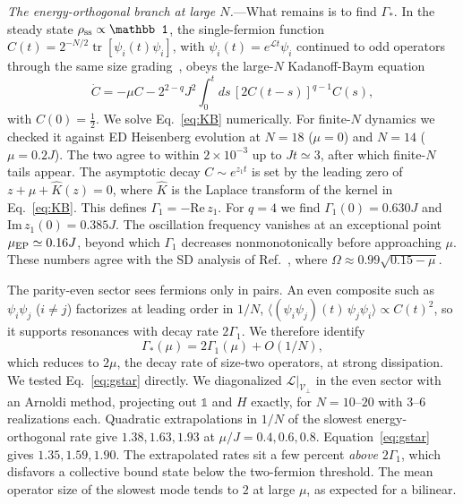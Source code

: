 \documentclass[aps,prl,twocolumn,superscriptaddress,amsmath,amssymb,10pt]{revtex4-2}
\newcommand{\Lc}{\mathcal{L}}
\newcommand{\tr}{\operatorname{tr}}
\begin{document}
\emph{The energy-orthogonal branch at large $N$.}---What remains is to find $\Gamma_\ast$. In the steady state $\rho_{\rm ss}\propto\mathbb 1$, the single-fermion function $C(t)=2^{-N/2}\tr[\psi_i(t)\psi_i]$, with $\psi_i(t)=e^{\Lc t}\psi_i$ continued to odd operators through the same size grading~\cite{Kulkarni2022,Garcia2023}, obeys the large-$N$ Kadanoff-Baym equation
\begin{equation}
\dot C=-\mu C-2^{2-q}J^2\!\int_0^t\!ds\,[2C(t-s)]^{q-1}C(s),
\label{eq:KB}
\end{equation}
with $C(0)=\tfrac12$. We solve Eq.~\eqref{eq:KB} numerically. For finite-$N$ dynamics we checked it against ED Heisenberg evolution at $N=18$ ($\mu=0$) and $N=14$ ($\mu=0.2J$). The two agree to within $2\times10^{-3}$ up to $Jt\simeq3$, after which finite-$N$ tails appear. The asymptotic decay $C\sim e^{z_1t}$ is set by the leading zero of $z+\mu+\hat K(z)=0$, where $\hat K$ is the Laplace transform of the kernel in Eq.~\eqref{eq:KB}. This defines $\Gamma_1=-\mathrm{Re}\,z_1$. For $q=4$ we find $\Gamma_1(0)=0.630J$ and $\mathrm{Im}\,z_1(0)=0.385J$. The oscillation frequency vanishes at an exceptional point $\mu_{\rm EP}\simeq0.16J$, beyond which $\Gamma_1$ decreases nonmonotonically before approaching $\mu$. These numbers agree with the SD analysis of Ref.~\cite{Garcia2023}, where $\Omega\approx0.99\sqrt{0.15-\mu}$.

The parity-even sector sees fermions only in pairs. An even composite such as $\psi_i\psi_j$ ($i\neq j$) factorizes at leading order in $1/N$, $\langle(\psi_i\psi_j)(t)\,\psi_j\psi_i\rangle\propto C(t)^2$, so it supports resonances with decay rate $2\Gamma_1$. We therefore identify
\begin{equation}
\Gamma_\ast(\mu)=2\Gamma_1(\mu)+O(1/N),
\label{eq:gstar}
\end{equation}
which reduces to $2\mu$, the decay rate of size-two operators, at strong dissipation. We tested Eq.~\eqref{eq:gstar} directly. We diagonalized $\Lc|_{\mathcal V_\perp}$ in the even sector with an Arnoldi method, projecting out $\mathbb 1$ and $H$ exactly, for $N=10$--$20$ with 3--6 realizations each. Quadratic extrapolations in $1/N$ of the slowest energy-orthogonal rate give $1.38,1.63,1.93$ at $\mu/J=0.4,0.6,0.8$. Equation~\eqref{eq:gstar} gives $1.35,1.59,1.90$. The extrapolated rates sit a few percent \emph{above} $2\Gamma_1$, which disfavors a collective bound state below the two-fermion threshold. The mean operator size of the slowest mode tends to $2$ at large $\mu$, as expected for a bilinear.
\end{document}
